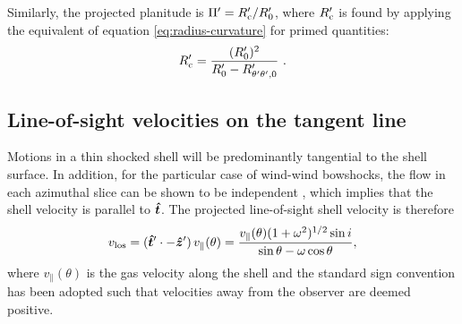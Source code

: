 Similarly, the projected planitude is \(\Pi' = R_{\mathrm{c}}' / R_0'\), where
\(R_{\mathrm{c}}'\) is found by applying the equivalent of equation
\eqref{eq:radius-curvature} for primed quantities:
\begin{equation}
  \label{eq:projected-radius-curvature}
  R_{\mathrm{c}}' 
  = \frac{(R_0')^2}{R_0' - R_{\theta'\theta',0}'} \ .
\end{equation}


\subsection{Line-of-sight velocities on the tangent line}
\label{sec:line-sight-veloc}
Motions in a thin shocked shell will be predominantly tangential to
the shell surface. In addition, for the particular case of wind-wind
bowshocks, the flow in each azimuthal slice can be shown to be
independent \citep{Wilkin:2000a}, which implies that the shell
velocity is parallel to \(\bm{\hat{t}}\). The projected line-of-sight
shell velocity is therefore
  \begin{equation}
    \label{eq:vlos}
    v_{\mathrm{los}} = (\bm{\hat{t}}' \cdot -\bm{\hat{z}}') \, v_{\parallel}(\theta) = \frac{v_{\parallel}(\theta) (1+\omega^2)^{1/2} \sin i }{\sin\theta - \omega\cos\theta} ,
  \end{equation}
  where \( v_{\parallel}(\theta)\) is the gas velocity along the shell and the standard sign convention has been adopted such that velocities away from the observer are deemed positive. 



